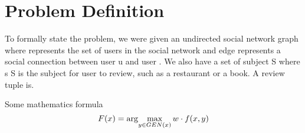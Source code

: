 \section{Problem Definition}

To formally state the problem, we were given an undirected social network graph 
where represents the set of users in the social network and edge represents a
social connection between user u and user . We also have a set of subject S where s  S is
the subject for user to review, such as a restaurant or a book. A review tuple is.
\par
Some mathematics formula $$F(x) = \arg\!\max_{y \in GEN(x)} w \cdot f(x, y)$$